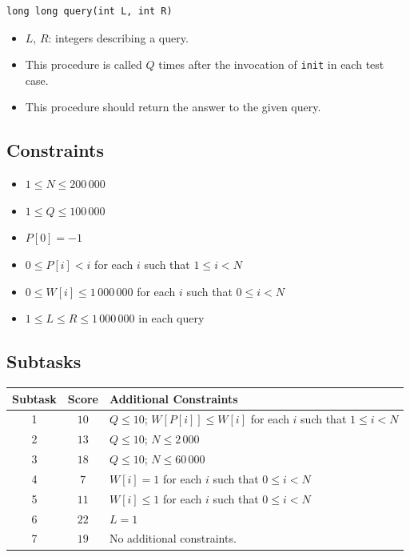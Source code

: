 \begin{verbatim}
long long query(int L, int R)
\end{verbatim}

\begin{itemize}
\tightlist
\item
  \(L\), \(R\): integers describing a query.
\item
  This procedure is called \(Q\) times after the invocation of
  \texttt{init} in each test case.
\item
  This procedure should return the answer to the given query.
\end{itemize}

\hypertarget{constraints}{%
\subsection{Constraints}\label{constraints}}

\begin{itemize}
\tightlist
\item
  \(1 \leq N \leq 200\,000\)
\item
  \(1 \leq Q \leq 100\,000\)
\item
  \(P[0] = -1\)
\item
  \(0 \leq P[i] < i\) for each \(i\) such that \(1 \leq i < N\)
\item
  \(0 \leq W[i] \leq 1\,000\,000\) for each \(i\) such that
  \(0 \leq i < N\)
\item
  \(1 \leq L \leq R \leq 1\,000\,000\) in each query
\end{itemize}

\hypertarget{subtasks}{%
\subsection{Subtasks}\label{subtasks}}

\begin{longtable}[]{@{}ccl@{}}
\toprule
Subtask & Score & Additional Constraints\tabularnewline
\midrule
\endhead
1 & \(10\) & \(Q \leq 10\); \(W[P[i]] \leq W[i]\) for each \(i\) such
that \(1 \leq i < N\)\tabularnewline
2 & \(13\) & \(Q \leq 10\); \(N \leq 2\,000\)\tabularnewline
3 & \(18\) & \(Q \leq 10\); \(N \leq 60\,000\)\tabularnewline
4 & \(7\) & \(W[i] = 1\) for each \(i\) such that
\(0 \leq i < N\)\tabularnewline
5 & \(11\) & \(W[i] \leq 1\) for each \(i\) such that
\(0 \leq i < N\)\tabularnewline
6 & \(22\) & \(L = 1\)\tabularnewline
7 & \(19\) & No additional constraints.\tabularnewline
\bottomrule
\end{longtable}

